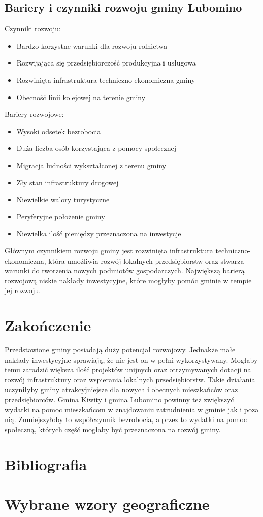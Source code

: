 \documentclass[a4paper,10pt]{article}
\begin{document}
  \subsection{Bariery i czynniki rozwoju gminy Lubomino}
    Czynniki rozwoju:
    
    \begin{itemize}
     \item Bardzo korzystne warunki dla rozwoju rolnictwa
     \item Rozwijająca się przedsiębiorczość produkcyjna i usługowa
     \item Rozwinięta infrastruktura techniczno-ekonomiczna gminy
     \item Obecność linii kolejowej na terenie gminy
    \end{itemize}
    
    Bariery rozwojowe:
    \begin{itemize}
     \item Wysoki odsetek bezrobocia
     \item Duża liczba osób korzystająca z pomocy społecznej
     \item Migracja ludności wykształconej z terenu gminy
     \item Zły stan infrastruktury drogowej
     \item Niewielkie walory turystyczne
     \item Peryferyjne położenie gminy
     \item Niewielka ilość pieniędzy przeznaczona na inwestycje
    \end{itemize}
    
    Głównym czynnikiem rozwoju gminy jest rozwinięta infrastruktura techniczno-ekonomiczna, 
    która umożliwia rozwój lokalnych przedsiębiorstw oraz stwarza warunki do tworzenia nowych podmiotów gospodarczych.
    Największą barierą rozwojową niskie nakłady inwestycyjne, które mogłyby pomóc gminie w tempie jej rozwoju.

\newpage    
\section{Zakończenie}
  Przedstawione gminy posiadają duży potencjał rozwojowy. Jednakże małe nakłady inwestycyjne sprawiają, że nie jest on w pełni wykorzystywany. 
  Mogłaby temu zaradzić większa ilość projektów unijnych oraz otrzymywanych dotacji na rozwój infrastruktury oraz wspierania lokalnych przedsiębiorstw. 
  Takie działania uczyniłyby gminy atrakcyjniejsze dla nowych i obecnych mieszkańców oraz przedsiębiorców.
  Gmina Kiwity i gmina Lubomino powinny też zwiększyć wydatki na pomoc mieszkańcom w znajdowaniu zatrudnienia w gminie jak i poza nią. 
  Zmniejszyłoby to współczynnik bezrobocia, a przez to wydatki na pomoc społeczną, których część mogłaby być przeznaczona na rozwój gminy.

\newpage
\section{Bibliografia}
\section{Wybrane wzory geograficzne}
\end{document}
